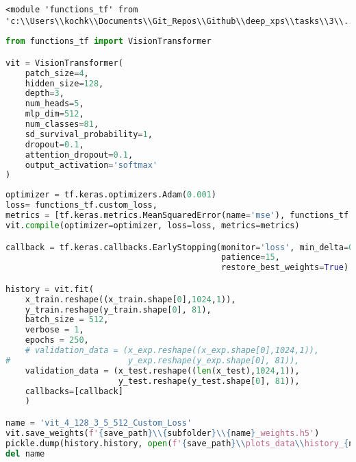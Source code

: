 \begin{lstlisting}
<module 'functions_tf' from 'c:\\Users\\kochk\\Documents\\Git_Repos\\Github\\deep_xps\\tasks\\3\\../../modules\\functions_tf.py'>
\end{lstlisting}

\begin{lstlisting}[language=Python]
from functions_tf import VisionTransformer

vit = VisionTransformer(
    patch_size=4,
    hidden_size=128,
    depth=3,
    num_heads=5,
    mlp_dim=512,
    num_classes=81,
    sd_survival_probability=1,
    dropout=0.1,
    attention_dropout=0.1,
    output_activation='softmax'
)
\end{lstlisting}

\begin{lstlisting}[language=Python]
optimizer = tf.keras.optimizers.Adam(0.001)
loss= functions_tf.custom_loss,
metrics = [tf.keras.metrics.MeanSquaredError(name='mse'), functions_tf.custom_accuracy]
vit.compile(optimizer=optimizer, loss=loss, metrics=metrics)

callback = tf.keras.callbacks.EarlyStopping(monitor='loss', min_delta=0.0001,
                                            patience=15,
                                            restore_best_weights=True)

history = vit.fit(
    x_train.reshape((x_train.shape[0],1024,1)),
    y_train.reshape(y_train.shape[0], 81),
    batch_size = 512,
    verbose = 1,
    epochs = 250,
    # validation_data = (x_exp.reshape((x_exp.shape[0],1024,1)),
#                        y_exp.reshape(y_exp.shape[0], 81)),
    validation_data = (x_test.reshape((len(x_test),1024,1)),
                       y_test.reshape(y_test.shape[0], 81)),
    callbacks=[callback]
    )

name = 'vit_4_128_3_5_512_Custom_Loss'
vit.save_weights(f'{save_path}\\{subfolder}\\{name}_weights.h5')
pickle.dump(history.history, open(f'{save_path}\\plots_data\\history_{name}.pkl', 'wb'))
del name
\end{lstlisting}


